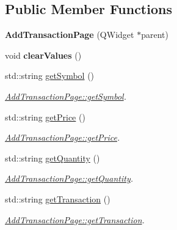 \subsection*{Public Member Functions}
\begin{DoxyCompactItemize}
\item 
\mbox{\label{class_add_transaction_page_a62aa1bce55d2e484ebab85794c8f0810}} 
{\bfseries Add\+Transaction\+Page} (Q\+Widget $\ast$parent)
\item 
\mbox{\label{class_add_transaction_page_a4ab52ff6c4b39d0f24586630cb1e662e}} 
void {\bfseries clear\+Values} ()
\item 
std\+::string \mbox{\hyperlink{class_add_transaction_page_a6bbaa7bd372987922aa710c543f78668}{get\+Symbol}} ()
\begin{DoxyCompactList}\small\item\em \mbox{\hyperlink{class_add_transaction_page_a6bbaa7bd372987922aa710c543f78668}{Add\+Transaction\+Page\+::get\+Symbol}}. \end{DoxyCompactList}\item 
std\+::string \mbox{\hyperlink{class_add_transaction_page_a2fa90d880190417bbf223ef8c73d797b}{get\+Price}} ()
\begin{DoxyCompactList}\small\item\em \mbox{\hyperlink{class_add_transaction_page_a2fa90d880190417bbf223ef8c73d797b}{Add\+Transaction\+Page\+::get\+Price}}. \end{DoxyCompactList}\item 
std\+::string \mbox{\hyperlink{class_add_transaction_page_a82f790ea61da26f20e03d835d432a841}{get\+Quantity}} ()
\begin{DoxyCompactList}\small\item\em \mbox{\hyperlink{class_add_transaction_page_a82f790ea61da26f20e03d835d432a841}{Add\+Transaction\+Page\+::get\+Quantity}}. \end{DoxyCompactList}\item 
std\+::string \mbox{\hyperlink{class_add_transaction_page_a109f081b4117d9c7451ed7079598dddb}{get\+Transaction}} ()
\begin{DoxyCompactList}\small\item\em \mbox{\hyperlink{class_add_transaction_page_a109f081b4117d9c7451ed7079598dddb}{Add\+Transaction\+Page\+::get\+Transaction}}. \end{DoxyCompactList}\item 

\end{DoxyCompactItemize}
